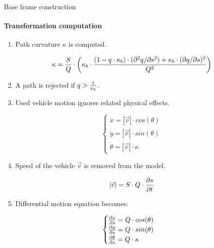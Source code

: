 \begin{frame}{Base frame construction}
  \framesubtitle{Transformation computation}
  \begin{enumerate}
   \item Path curvature $\kappa$ is computed.
   \begin{minipage}[c]{\textwidth}
    \tiny
    \begin{equation}\nonumber
      \kappa = {S \over Q} \cdot \left ( \kappa_b \cdot { 
      {(1 - q \cdot \kappa_b) \cdot (\partial^2q / \partial s^2) +
      \kappa_b \cdot (\partial q / \partial s )^2
      } 
      \over {Q^2} } \right )
      \end{equation}
   \end{minipage}
    \item A path is rejected if $q > {1 \over \kappa_b}$.
    \item Used vehicle motion ignores related physical effects.
      \begin{minipage}[c]{\textwidth}
	  \tiny
	\begin{equation}\nonumber
	  \begin{cases}
	  \dot{x} = |\vec{v}| \cdot cos(\theta) \\
	  \dot{y} = |\vec{v}| \cdot sin(\theta) \\
	  \dot{\theta} = |\vec{v}| \cdot \kappa
	  \end{cases}
	\end{equation}
    \end{minipage}
    \item Speed of the vehicle $\vec{v}$ is removed from the model.
      \begin{minipage}[c]{\textwidth}
	  \tiny
	\begin{equation}\nonumber
	  |\vec{v}| = S \cdot Q \cdot { {\partial s} \over {\partial t}}
	\end{equation}
      \end{minipage}
    \item Differential motion equation becomes:
      \begin{minipage}[c]{\textwidth}
	  \tiny
	\begin{equation}\nonumber
	  \begin{cases}
	    {{\partial x} \over {\partial s}} = Q \cdot cos(\theta) \\
	    {{\partial y} \over {\partial s}} = Q \cdot sin(\theta) \\
	    {{\partial \theta} \over {\partial s}} = Q \cdot \kappa
	  \end{cases}
	\end{equation}
      \end{minipage}
  \end{enumerate}


\end{frame}
